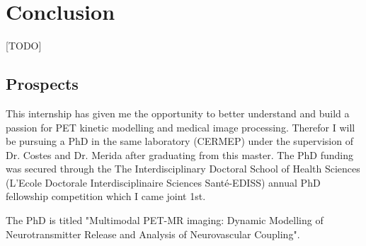 \chapter{Conclusion}
 [TODO]

\section*{Prospects}
This internship has given me the opportunity to better understand and build a passion for PET kinetic modelling and medical image processing.
Therefor I will be pursuing a PhD in the same laboratory (CERMEP) under the supervision of Dr. Costes and Dr. Merida after graduating from this master.
The PhD funding was secured through the The Interdisciplinary Doctoral School of Health Sciences (L'Ecole Doctorale Interdisciplinaire Sciences Santé-EDISS) annual PhD fellowship competition which I came joint 1st.

The PhD is titled "Multimodal PET-MR imaging: Dynamic Modelling of Neurotransmitter Release and Analysis of Neurovascular Coupling".
